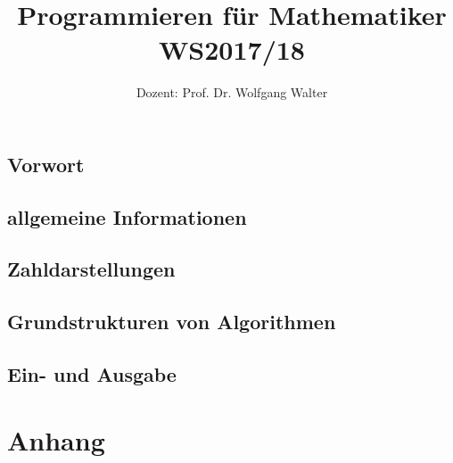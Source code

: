 \documentclass[ngerman,a4paper,order=firstname]{./templates/mathscript/mathscript}
\title{\textbf{Programmieren für Mathematiker WS2017/18}}
\author{Dozent: Prof. Dr. Wolfgang Walter}
\begin{document}
\pagestyle{plain}

\maketitle

\hypertarget{tocpage}{}
\tableofcontents
{}

\pagebreak
{}
\pagestyle{fancy}

\chapter*{Vorwort}


\chapter{allgemeine Informationen}


\chapter{Zahldarstellungen}





\chapter{Grundstrukturen von Algorithmen}







\chapter{Ein- und Ausgabe}



\part*{Anhang}
\appendix


\printindex
\end{document}

